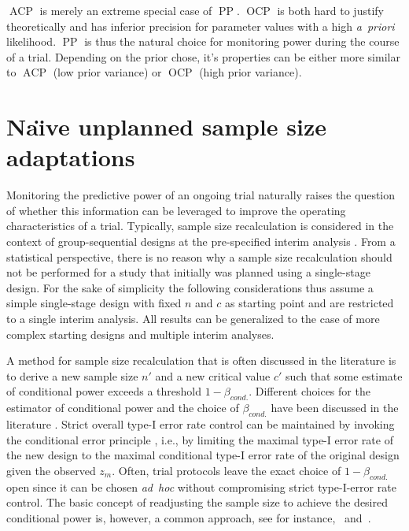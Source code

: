 \documentclass{article}
\newcommand{\ACP}{\ensuremath{\operatorname{ACP}}}
\newcommand{\OCP}{\ensuremath{\operatorname{OCP}}}
\newcommand{\PP}{\ensuremath{\operatorname{PP}}}
\begin{document}
$\ACP$ is merely an extreme special case of $\PP$. 
$\OCP$ is both hard to justify theoretically and has inferior precision
for parameter values with a high \textit{a~priori} likelihood.
$\PP$ is thus the natural choice for monitoring power during the course of a trial.
Depending on the prior chose, it's properties can be either more similar to $\ACP$ (low prior variance) or $\OCP$ (high prior variance).



\section{Na\"{\i}ve unplanned sample size adaptations}
\label{sec:naive-adaptations}

Monitoring the predictive power of an ongoing trial naturally raises the question of whether this information can be leveraged to improve the operating characteristics of a trial.
Typically, sample size recalculation is considered in the context of group-sequential designs at the pre-specified interim analysis \citep{proschan1995,brannath2004,bauer2016}.
From a statistical perspective, 
there is no reason why a sample size recalculation should not be
performed for a study that initially was planned using a single-stage design.
For the sake of simplicity the following considerations thus assume a simple 
single-stage design with fixed $n$ and $c$ as starting point and are
restricted to a single interim analysis.
All results can be generalized to the case of more complex starting designs and multiple interim analyses.

A method for sample size recalculation that is often discussed in the literature is to derive a new sample size $n'$ and a new critical value $c'$ such that some estimate of conditional power exceeds a threshold $1-\beta_{cond.}$.
Different choices for the estimator of conditional power
and the choice of $\beta_{cond.}$ have been discussed in the literature \citep{proschan1995,brannath2004,bauer2016}.
Strict overall type-I error rate control can be maintained by invoking the conditional error principle \citep{muller2001,muller2004,brannath2012}, i.e., by limiting the maximal type-I error rate of the new design to the maximal conditional type-I error rate of the original design given the observed $z_m$.
Often, trial protocols leave the exact choice of $1-\beta_{cond.}$ open since it can be chosen \textit{ad~hoc}
without compromising strict type-I-error rate control.
The basic concept of readjusting the sample size to achieve the desired conditional power is, however, a common approach, see for instance,~\citet{bhatt2013} and~\citet{mehta2009}.
\end{document}
